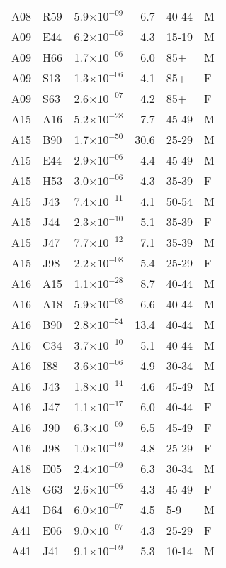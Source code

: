 \begin{longtable}{lllrll}
   A08 & R59 & 5.9$\times10^{-09}$ & 6.7 & 40-44 & M \\ 
   A09 & E44 & 6.2$\times10^{-06}$ & 4.3 & 15-19 & M \\ 
   A09 & H66 & 1.7$\times10^{-06}$ & 6.0 & 85+ & M \\ 
   A09 & S13 & 1.3$\times10^{-06}$ & 4.1 & 85+ & F \\ 
   A09 & S63 & 2.6$\times10^{-07}$ & 4.2 & 85+ & F \\ 
   A15 & A16 & 5.2$\times10^{-28}$ & 7.7 & 45-49 & M \\ 
   A15 & B90 & 1.7$\times10^{-50}$ & 30.6 & 25-29 & M \\ 
   A15 & E44 & 2.9$\times10^{-06}$ & 4.4 & 45-49 & M \\ 
   A15 & H53 & 3.0$\times10^{-06}$ & 4.3 & 35-39 & F \\ 
   A15 & J43 & 7.4$\times10^{-11}$ & 4.1 & 50-54 & M \\ 
   A15 & J44 & 2.3$\times10^{-10}$ & 5.1 & 35-39 & F \\ 
   A15 & J47 & 7.7$\times10^{-12}$ & 7.1 & 35-39 & M \\ 
   A15 & J98 & 2.2$\times10^{-08}$ & 5.4 & 25-29 & F \\ 
   A16 & A15 & 1.1$\times10^{-28}$ & 8.7 & 40-44 & M \\ 
   A16 & A18 & 5.9$\times10^{-08}$ & 6.6 & 40-44 & M \\ 
   A16 & B90 & 2.8$\times10^{-54}$ & 13.4 & 40-44 & M \\ 
   A16 & C34 & 3.7$\times10^{-10}$ & 5.1 & 40-44 & M \\ 
   A16 & I88 & 3.6$\times10^{-06}$ & 4.9 & 30-34 & M \\ 
   A16 & J43 & 1.8$\times10^{-14}$ & 4.6 & 45-49 & M \\ 
   A16 & J47 & 1.1$\times10^{-17}$ & 6.0 & 40-44 & F \\ 
   A16 & J90 & 6.3$\times10^{-09}$ & 6.5 & 45-49 & F \\ 
   A16 & J98 & 1.0$\times10^{-09}$ & 4.8 & 25-29 & F \\ 
   A18 & E05 & 2.4$\times10^{-09}$ & 6.3 & 30-34 & M \\ 
   A18 & G63 & 2.6$\times10^{-06}$ & 4.3 & 45-49 & F \\ 
   A41 & D64 & 6.0$\times10^{-07}$ & 4.5 & 5-9 & M \\ 
   A41 & E06 & 9.0$\times10^{-07}$ & 4.3 & 25-29 & F \\ 
   A41 & J41 & 9.1$\times10^{-09}$ & 5.3 & 10-14 & M \\ 

\end{longtable}
